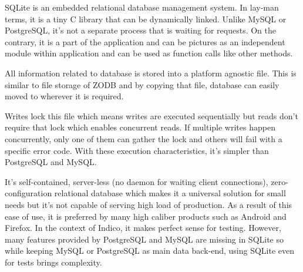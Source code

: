SQLite is an embedded relational database management system. In lay-man terms, it is a tiny C library that can be dynamically linked. Unlike MySQL or PostgreSQL, it's not a separate process that is waiting for requests. On the contrary, it is a part of the application and can be pictures as an independent module within application and can be used as function calls like other methods.

All information related to database is stored into a platform agnostic file. This is similar to file storage of ZODB and by copying that file, database can easily moved to wherever it is required.

Writes lock this file which means writes are executed sequentially but reads don't require that lock which enables concurrent reads. If multiple writes happen concurrently, only one of them can gather the lock and others will fail with a specific error code. With these execution characteristics, it's simpler than PostgreSQL and MySQL.

It's self-contained, server-less (no daemon for waiting client connections), zero-configuration relational database which makes it a universal solution for small needs but it's not capable of serving high load of production. As a result of this ease of use, it is preferred by many high caliber products such as Android and Firefox. In the context of Indico, it makes perfect sense for testing. However, many features provided by PostgreSQL and MySQL are missing in SQLite so while keeping MySQL or PostgreSQL as main data back-end, using SQLite even for tests brings complexity.

